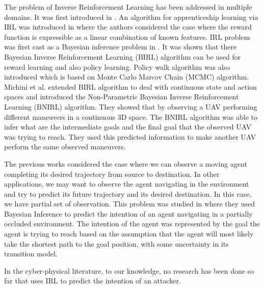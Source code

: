 \documentclass[letterpaper, 10 pt, conference]{ieeeconf}  %
\begin{document}
The problem of Inverse Reinforcement Learning has been addressed in multiple domains. It was first introduced in \cite{Ng2000}. An algorithm for apprenticeship learning via IRL was introduced in \cite{Abbeel2004a} where the authors considered the case where the reward function is expressible as a linear combination of known features. IRL problem was first cast as a Bayesian inference problem in  \cite{Ramachandran2007}. It was shown that there Bayesian Inverse Reinforcement Learning (BIRL) algorithm can be used for reward learning and also policy learning. Policy walk algorithm was also introduced which is based on Monte Carlo Marcov Chain (MCMC) algorithm. Michini et al. \cite{Michini2015,Michini2013,Michini2012} extended BIRL algorithm to deal with continuous state and action spaces and introduced the Non-Parametric Bayesian Inverse Reinforcement Learning (BNIRL) algorithm. They  showed that by observing a UAV performing different maneuvers in a continuous 3D space. The BNIRL algorithm was able to infer what are the intermediate goals and the final goal that the observed UAV was trying to reach. They used this predicted information to make another UAV perform the same observed maneuvers.

The previous works considered the case where we can observe a moving agent completing its desired trajectory from source to destination. In other applications, we may want to observe the agent navigating in the environment and try to predict its future trajectory and its desired destination. In this case, we have partial set of observation. This problem was studied in \cite{Best2015} where they used Bayesian Inference to predict the intention of an agent navigating in a partially occluded environment. The intention of the agent was represented by the goal the agent is trying to reach based on the assumption that the agent will most likely take the shortest path to the goal position, with some uncertainty in its transition model.

In the cyber-physical literature, to our knowledge, no research has been done so far that uses IRL to predict the intention of an attacker.
\end{document}

